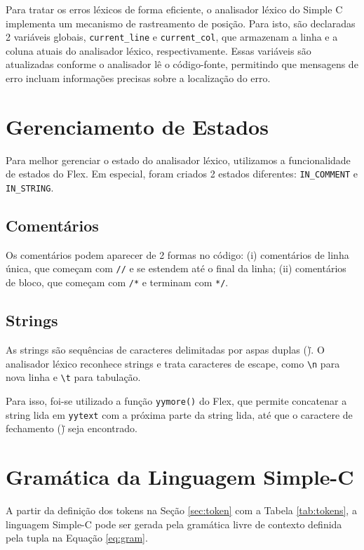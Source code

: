 \documentclass[12pt,a4paper]{article}
\begin{document}
Para tratar os erros léxicos de forma eficiente, o analisador léxico do Simple C implementa um mecanismo de rastreamento de posição. Para isto, são declaradas 2 variáveis globais, \texttt{current\_line} e \texttt{current\_col}, que armazenam a linha e a coluna atuais do analisador léxico, respectivamente. Essas variáveis são atualizadas conforme o analisador lê o código-fonte, permitindo que mensagens de erro incluam informações precisas sobre a localização do erro.

\section{Gerenciamento de Estados}
\label{sec:estados}
Para melhor gerenciar o estado do analisador léxico, utilizamos a funcionalidade de estados do Flex. Em especial, foram criados 2 estados diferentes: \texttt{IN\_COMMENT} e \texttt{IN\_STRING}. 

\subsection{Comentários}
Os comentários podem aparecer de 2 formas no código: (i) comentários de linha única, que começam com \texttt{//} e se estendem até o final da linha; (ii) comentários de bloco, que começam com \texttt{/*} e terminam com \texttt{*/}.

\subsection{Strings}

As strings são sequências de caracteres delimitadas por aspas duplas (\texttt{\"}). O analisador léxico reconhece strings e trata caracteres de escape, como \texttt{\textbackslash n} para nova linha e \texttt{\textbackslash t} para tabulação.

Para isso, foi-se utilizado a função \texttt{yymore()} do Flex, que permite concatenar a string lida em \texttt{yytext} com a próxima parte da string lida, até que o caractere de fechamento (\texttt{\"}) seja encontrado.


\section{Gramática da Linguagem Simple-C}
\label{sec:gram}
A partir da definição dos tokens na Seção \ref{sec:token} com a Tabela \ref{tab:tokens}, a linguagem Simple-C pode ser gerada pela gramática livre de contexto definida pela tupla na Equação \ref{eq:gram}. 
\end{document}
